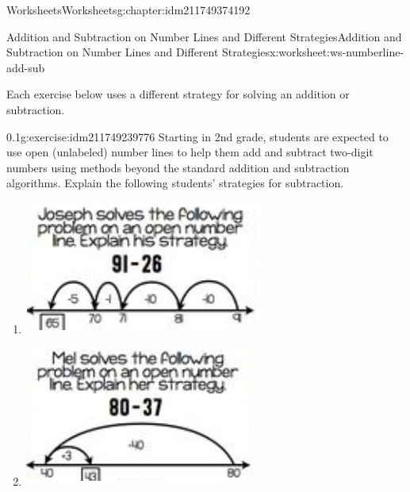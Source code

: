 \documentclass[twoside,11pt,]{book}
\begin{document}
\begin{chapterptx}{Worksheets}{}{Worksheets}{}{}{g:chapter:idm211749374192}
\begin{worksheet-section-numberless}{Addition and Subtraction on Number Lines and Different Strategies}{}{Addition and Subtraction on Number Lines and Different Strategies}{}{}{x:worksheet:ws-numberline-add-sub}
\begin{introduction}{}%
Each exercise below uses a different strategy for solving an addition or subtraction.%
\end{introduction}%
\begin{divisionexercise}{1}{}{0.1}{g:exercise:idm211749239776}%
Starting in 2nd grade, students are expected to use open (unlabeled) number lines to help them add and subtract two-digit numbers using methods beyond the standard addition and subtraction algorithms.   Explain the following students’ strategies for subtraction.%
%
\begin{enumerate}[label=(\alph*)]
\item{}\begin{sidebyside}{1}{0.15}{0.15}{0}%
\begin{sbspanel}{0.7}%
\includegraphics[width=1\linewidth]{images/numberline-add-sub-1a.png}
\end{sbspanel}%
\end{sidebyside}%
%
\item{}\begin{sidebyside}{1}{0.15}{0.15}{0}%
\begin{sbspanel}{0.7}%
\includegraphics[width=1\linewidth]{images/numberline-add-sub-1b.png}

\end{sbspanel}
\end{sidebyside}
\end{enumerate}
\end{divisionexercise}
\end{worksheet-section-numberless}
\end{chapterptx}
\end{document}
